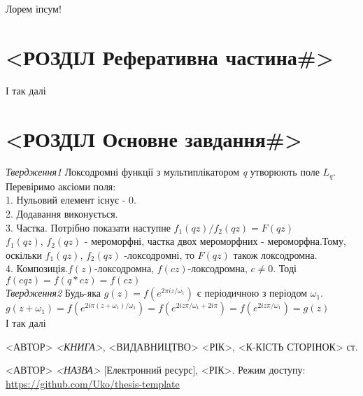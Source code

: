 \documentclass[12pt,a4paper]{article}
\begin{document}
Лорем іпсум!\cite{alias}

\clearpage

\section{<РОЗДІЛ Реферативна частина\#>}

І так далі\cite{web}

\clearpage
\section{<РОЗДІЛ Основне завдання\#>}

\emph{Твердження1} Локсодромні функції з мультиплікатором \textit{q} утворюють поле $L_{q}$. \\
Перевіримо аксіоми поля:\\
1. Нульовий елемент існує - 0.\\
2. Додавання виконується.\\
3. Частка. Потрібно показати наступне $f_{1}(qz)/f_{2}(qz)=F(qz)$\\
$f_{1}(qz)$, $f_{2}(qz)$ - мероморфні, частка двох мероморфних - мероморфна.Тому, оскільки $f_{1}(qz)$, $f_{2}(qz)$ -локсодромні, то $ F(qz)$ також локсодромна.\\
4. Композиція.$f(z)$-локсодромна, $f(cz)$-локсодромна, $c \neq 0$. Тоді  $f(cqz)=f(q*cz)=f(cz)$\\
\emph{Твердження2} Будь-яка $g(z)=f(e^{2\pi iz/\omega_{1}})$ є періодичною з періодом $\omega_{1}$.\\
$g(  z+\omega_{1}  ) = f(  e^{  2i\pi (z+\omega_{1})  / \omega_{1}  }  ) =  f(  e^{  2iz\pi / \omega_{1}  +2i\pi } ) = f(  e^{  2iz\pi / \omega_{1}  } ) = g(z)$ \\


І так далі\cite{web}

\clearpage
{}
\begin{thebibliography}{9}

  <АВТОР> \emph{<КНИГА>},
    <ВИДАВНИЦТВО> <РІК>, <К-КІСТЬ СТОРІНОК> ст.
    
  <АВТОР> \emph{<НАЗВА>} [Електронний ресурс],
    <РІК>. Режим доступу:
    \url{https://github.com/Uko/thesis-template}

\end{thebibliography}
\end{document}
